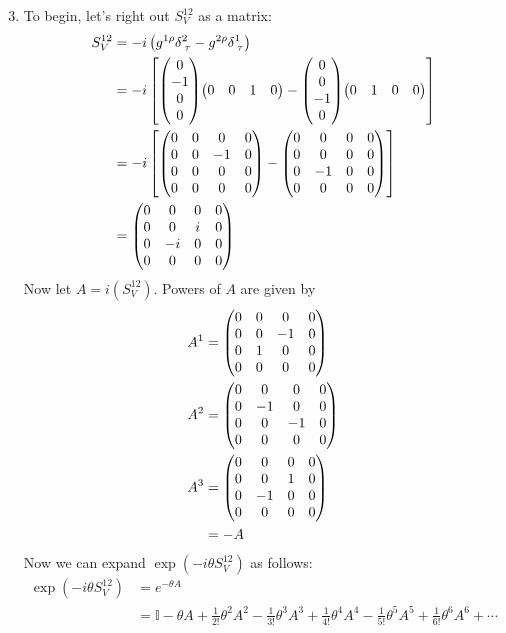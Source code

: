 \documentclass[12pt]{article}
\begin{document}
\begin{enumerate}[label=(\alph*)]
    \setcounter{enumi}{2}
    \item To begin, let's right out $S_V^{12}$ as a matrix:
    \begin{align*}
        S_V^{12} &= -i\left(g^{1\rho}\delta_{\;\tau}^2 - g^{2\rho}\delta_{\;\tau}^1\right) \\
        &= -i\left[\mqty(0\\-1\\0\\0)\mqty(0&0&1&0) - \mqty(0\\0\\-1\\0)\mqty(0&1&0&0) \right] \\
        &= -i\left[\mqty(0&0&0&0\\0&0&-1&0\\0&0&0&0\\0&0&0&0) - \mqty(0&0&0&0\\0&0&0&0\\0&-1&0&0\\0&0&0&0)\right] \\
        &= \mqty(0&0&0&0\\0&0&i&0\\0&-i&0&0\\0&0&0&0)
    \end{align*}
    Now let $A = i\left(S_V^{12}\right)$. Powers of $A$ are given by
    \begin{align*}
        A^1 &= \mqty(0&0&0&0\\0&0&-1&0\\0&1&0&0\\0&0&0&0) \\
        A^2 &= \mqty(0&0&0&0\\0&-1&0&0\\0&0&-1&0\\0&0&0&0) \\
        A^3 &= \mqty(0&0&0&0\\0&0&1&0\\0&-1&0&0\\0&0&0&0) \\
        &= -A
    \end{align*}
    Now we can expand $\exp(-i\theta S_V^{12})$ as follows:
    \begin{align*}
        \exp(-i\theta S_V^{12}) &= e^{-\theta A} \\
        &= \mathbb{I} - \theta A + \frac{1}{2!}\theta^2A^2 - \frac{1}{3!}\theta^3A^3 + \frac{1}{4!}\theta^4A^4 - \frac{1}{5!}\theta^5A^5 + \frac{1}{6!}\theta^6A^6 + \cdots \\

\end{align*}
\end{enumerate}
\end{document}
